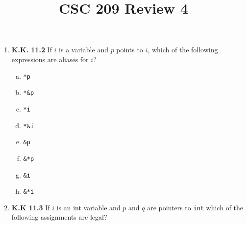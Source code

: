 \documentclass[12pt]{article}
\begin{document}
\title{CSC 209 Review 4}
\maketitle

\bigskip

\begin{enumerate}[1.]
    \item \textbf{K.K. 11.2} If $i$ is a variable and $p$ points to $i$,
    which of the following expressions are aliases for $i$?

    \begin{enumerate}[a)]
        \item \texttt{*p}
        \item \texttt{*\&p}
        \item \texttt{*i}
        \item \texttt{*\&i}
        \item \texttt{\&p}
        \item \texttt{\&*p}
        \item \texttt{\&i}
        \item \texttt{\&*i}
    \end{enumerate}

    \item \textbf{K.K 11.3} If $i$ is an int variable and $p$ and $q$ are pointers to \texttt{int}
    which of the following assignments are legal?


\end{enumerate}
\end{document}
